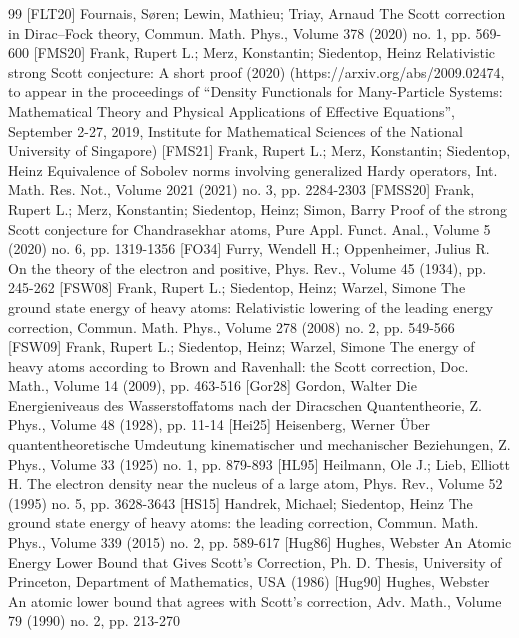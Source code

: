 \begin{thebibliography}{99}
 [FLT20] Fournais, Søren; Lewin, Mathieu; Triay, Arnaud The Scott correction in Dirac–Fock theory, Commun. Math. Phys., Volume 378 (2020) no. 1, pp. 569-600
 [FMS20] Frank, Rupert L.; Merz, Konstantin; Siedentop, Heinz Relativistic strong Scott conjecture: A short proof (2020) (https://arxiv.org/abs/2009.02474, to appear in the proceedings of “Density Functionals for Many-Particle Systems: Mathematical Theory and Physical Applications of Effective Equations”, September 2-27, 2019, Institute for Mathematical Sciences of the National University of Singapore)
 [FMS21] Frank, Rupert L.; Merz, Konstantin; Siedentop, Heinz Equivalence of Sobolev norms involving generalized Hardy operators, Int. Math. Res. Not., Volume 2021 (2021) no. 3, pp. 2284-2303
 [FMSS20] Frank, Rupert L.; Merz, Konstantin; Siedentop, Heinz; Simon, Barry Proof of the strong Scott conjecture for Chandrasekhar atoms, Pure Appl. Funct. Anal., Volume 5 (2020) no. 6, pp. 1319-1356
 [FO34] Furry, Wendell H.; Oppenheimer, Julius R. On the theory of the electron and positive, Phys. Rev., Volume 45 (1934), pp. 245-262
 [FSW08] Frank, Rupert L.; Siedentop, Heinz; Warzel, Simone The ground state energy of heavy atoms: Relativistic lowering of the leading energy correction, Commun. Math. Phys., Volume 278 (2008) no. 2, pp. 549-566
 [FSW09] Frank, Rupert L.; Siedentop, Heinz; Warzel, Simone The energy of heavy atoms according to Brown and Ravenhall: the Scott correction, Doc. Math., Volume 14 (2009), pp. 463-516
 [Gor28] Gordon, Walter Die Energieniveaus des Wasserstoffatoms nach der Diracschen Quantentheorie, Z. Phys., Volume 48 (1928), pp. 11-14
 [Hei25] Heisenberg, Werner Über quantentheoretische Umdeutung kinematischer und mechanischer Beziehungen, Z. Phys., Volume 33 (1925) no. 1, pp. 879-893
 [HL95] Heilmann, Ole J.; Lieb, Elliott H. The electron density near the nucleus of a large atom, Phys. Rev., Volume 52 (1995) no. 5, pp. 3628-3643
 [HS15] Handrek, Michael; Siedentop, Heinz The ground state energy of heavy atoms: the leading correction, Commun. Math. Phys., Volume 339 (2015) no. 2, pp. 589-617
 [Hug86] Hughes, Webster An Atomic Energy Lower Bound that Gives Scott’s Correction, Ph. D. Thesis, University of Princeton, Department of Mathematics, USA (1986)
 [Hug90] Hughes, Webster An atomic lower bound that agrees with Scott’s correction, Adv. Math., Volume 79 (1990) no. 2, pp. 213-270

\end{thebibliography}
